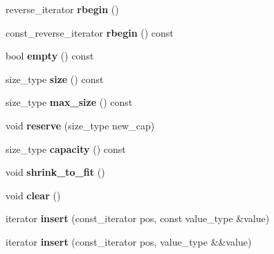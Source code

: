 \begin{DoxyCompactItemize}
\item 
\mbox{\label{classdsp_1_1_signal_a0ef60569b1ba241aceb8b28a9cc3b5b9}} 
reverse\+\_\+iterator {\bfseries rbegin} ()
\item 
\mbox{\label{classdsp_1_1_signal_acc8b7b6cc95e992ace74111fa8ccedc4}} 
const\+\_\+reverse\+\_\+iterator {\bfseries rbegin} () const
\item 
\mbox{\label{classdsp_1_1_signal_a8a30493cd501cac320cfc10f8d040306}} 
bool {\bfseries empty} () const
\item 
\mbox{\label{classdsp_1_1_signal_a5958a2fd85e848830f37ac0e0ae7fed8}} 
size\+\_\+type {\bfseries size} () const
\item 
\mbox{\label{classdsp_1_1_signal_aed27b39a11b7861571c27750c4f78ab5}} 
size\+\_\+type {\bfseries max\+\_\+size} () const
\item 
\mbox{\label{classdsp_1_1_signal_aa4c7cbf1deb162b2e2604b2e62248d1d}} 
void {\bfseries reserve} (size\+\_\+type new\+\_\+cap)
\item 
\mbox{\label{classdsp_1_1_signal_a191f196866046451e0eb335e26971dc7}} 
size\+\_\+type {\bfseries capacity} () const
\item 
\mbox{\label{classdsp_1_1_signal_a96dd0c81a37c2773c43856099a42c4b7}} 
void {\bfseries shrink\+\_\+to\+\_\+fit} ()
\item 
\mbox{\label{classdsp_1_1_signal_a1d3def37c9f5fae64d653b9ab84b159d}} 
void {\bfseries clear} ()
\item 
\mbox{\label{classdsp_1_1_signal_ab1ab30237ec1b34bece6e6cdf330a987}} 
iterator {\bfseries insert} (const\+\_\+iterator pos, const value\+\_\+type \&value)
\item 
\mbox{\label{classdsp_1_1_signal_afc73abb65c0a898da5796c9551d76272}} 
iterator {\bfseries insert} (const\+\_\+iterator pos, value\+\_\+type \&\&value)
\item 

\end{DoxyCompactItemize}
